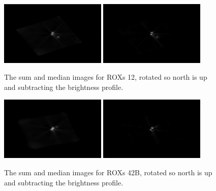 \documentclass[12pt]{article}
\begin{document}
\begin{figure}[H]
\centering
\includegraphics[width=0.45\textwidth]{sum_rot_sub_12.png}
\includegraphics[width=0.45\textwidth]{med_rot_sub_12.png}
\vspace{-1em}
\caption{The sum and median images for ROXs 12, rotated so north is up and subtracting the brightness profile.}
\end{figure}
\vspace{-1em}
\begin{figure}[H]
\centering
\includegraphics[width=0.45\textwidth]{sum_rot_sub_42b.png}
\includegraphics[width=0.45\textwidth]{med_rot_sub_42b.png}
\vspace{-1em}
\caption{The sum and median images for ROXs 42B, rotated so north is up and subtracting the brightness profile.}
\end{figure}
\vspace{-1em}
\end{document}
